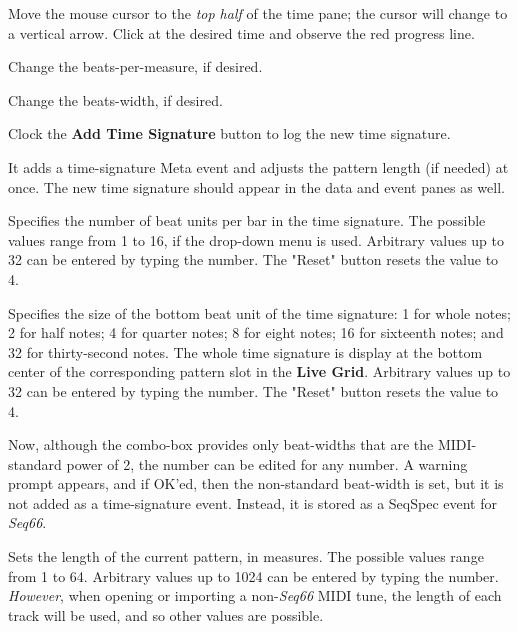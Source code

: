    \begin{enumber}
      \item Move the mouse cursor to the \textsl{top half} of the time pane;
         the cursor will change to a vertical arrow. Click at the desired time
         and observe the red progress line.
      \item Change the beats-per-measure, if desired.
      \item Change the beats-width, if desired.
      \item Clock the \textbf{Add Time Signature} button to log the
         new time signature.
   \end{enumber}

   It adds a time-signature Meta event and adjusts the pattern
   length (if needed) at once.
   The new time signature should appear in the data and event panes as well.

   Specifies the number of beat units per bar in the time signature.
   The possible values range from 1 to 16, if the drop-down menu is used.
   Arbitrary values up to 32 can be entered by typing the number.
   The "Reset" button resets the value to 4.

   Specifies the size of the bottom beat unit of the time signature:
   1 for whole notes; 2 for half notes; 4 for quarter notes; 8 for eight notes;
   16 for sixteenth notes; and 32 for thirty-second notes.
   The whole time signature is display at the bottom center of the
   corresponding pattern slot in the \textbf{Live Grid}.
   Arbitrary values up to 32 can be entered by typing the number.
   The "Reset" button resets the value to 4.

   Now, although the combo-box provides only beat-widths that are the
   MIDI-standard power of 2, the number can be edited for any number.
   A warning prompt appears, and if OK'ed, then the non-standard beat-width is
   set, but it is not added as a time-signature event.
   Instead, it is stored as a SeqSpec event for \textsl{Seq66}.

   Sets the length of the current pattern, in measures.
   The possible values range from 1 to 64.
   Arbitrary values up to 1024 can be entered by typing the number.
   \textsl{However}, when opening or importing a non-\textsl{Seq66}
   MIDI tune, the length of each track will be used, and so other values
   are possible.

